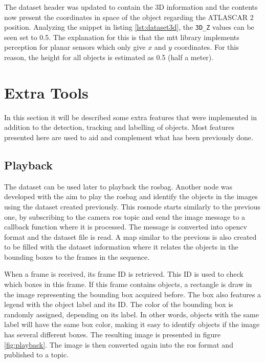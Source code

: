 The dataset header was updated to contain the 3D information and the contents now present the coordinates in space of the object regarding the ATLASCAR 2 position. Analyzing the snippet in listing \ref{lst:dataset3d}, the \texttt{3D\_Z} values can be seen set to 0.5. The explanation for this is that the \gls{mtt} library implements perception for planar sensors which only give $x$ and $y$ coordinates. For this reason, the height for all objects is estimated as 0.5 (half a meter). 

\section{Extra Tools}

In this section it will be described some extra features that were implemented in addition to the detection, tracking and labelling of objects. Most features presented here are used to aid and complement what has been previously done.

\subsection{Playback}

The dataset can be used later to playback the rosbag. Another node was developed with the aim to play the rosbag and identify the objects in the images using the dataset created previously. This rosnode starts similarly to the previous one, by subscribing to the camera \gls{ros} topic and send the image message to a callback function where it is processed. The message is converted into \gls{opencv} format and the dataset file is read. A map similar to the previous is also created to be filled with the dataset information where it relates the objects in the bounding boxes to the frames in the sequence. 

When a frame is received, its frame ID is retrieved. This ID is used to check which boxes in this frame. If this frame contains objects, a rectangle is draw in the image representing the bounding box acquired before. The box also features a legend with the object label and its ID. The color of the bounding box is randomly assigned, depending on its label. In other words, objects with the same label will have the same box color, making it easy to identify objects if the image has several different boxes. The resulting image is presented in figure \ref{fig:playback}. The image is then converted again into the \gls{ros} format and published to a topic.

